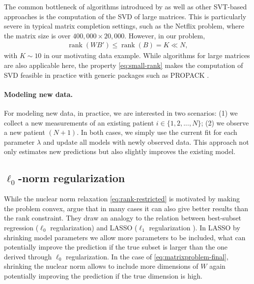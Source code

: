 \documentclass[preprint]{imsart}
\numberwithin{equation}{section}
\theoremstyle{plain}
\newcommand{\tr}[1]{{\textcolor{red}{#1}}}
\DeclareMathOperator*{\rank}{rank}
\begin{document}
The common bottleneck of algorithms introduced by \citet{cai2010singular,mazumder2010spectral,ma2011fixed} as well as other SVT-based approaches is the computation of the SVD of large matrices. This is particularly severe in typical matrix completion settings, such as the Netflix problem, where the matrix size is over $400{,}000 \times 20{,}000$. However, in our problem,
\begin{align}\label{eq:small-rank}
  \rank(WB') \leq \rank(B) = K \ll N,
\end{align}
with $K \sim 10$ in our motivating data example. While algorithms for large matrices are also applicable here, the property \eqref{eq:small-rank} makes the computation of SVD feasible in practice with generic packages such as PROPACK \citep{larsen2004propack}.

\paragraph{Modeling new data.}

For modeling new data, in practice, we are interested in two scenarios: (1) we collect a new measurements of an existing patient $i \in \{1,2,...,N\}$; (2) we observe a new patient $(N+1)$. In both cases, we simply use the current fit for each parameter $\lambda$ and update all models with newly observed data. This approach not only estimates new predictions but also slightly improves the existing model. 




\subsection{$\ell_0$-norm regularization}

While the nuclear norm relaxation \eqref{eq:rank-restricted} is motivated by making the problem convex, \citet{mazumder2010spectral} argue that in many cases it can also give better results than the rank constraint. They draw an analogy to the relation between best-subset regression ($\ell_0$ regularization) and LASSO ($\ell_1$ regularization \citep{tibshirani1996regression, friedman2001elements}). In LASSO by shrinking model parameters we allow more parameters to be included, what can potentially improve the prediction if the true subset is larger than the one derived through $\ell_0$ regularization. In the case of \eqref{eq:matrixproblem-final}, shrinking the nuclear norm allows to include more dimensions of $W$ again potentially improving the prediction if the true dimension is high.
\end{document}
